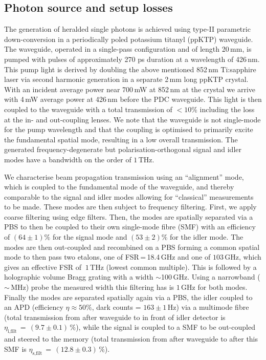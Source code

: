 \documentclass[%
 reprint,
 amsmath,amssymb,
 aps,
 pra,
]{revtex4-1}
\begin{document}
\subsection{Photon source and setup losses}
The generation of heralded single photons is achieved using type-II parametric down-conversion in a periodically poled potassium titanyl (ppKTP) waveguide. The waveguide, operated in a single-pass configuration and of length 20$\,$mm, is pumped with pulses of approximately 270 ps duration at a wavelength of 426\,nm. This pump light is derived by doubling the above mentioned 852\,nm Ti:sapphire laser via second harmonic generation in a separate 2$\,$mm long ppKTP crystal. With an incident average power near 700\,mW at 852\,nm at the crystal we arrive with 4\,mW average power at 426\,nm before the PDC waveguide. This light is then coupled to the waveguide with a total transmission of $<10\%$ including the loss at the in- and out-coupling lenses. We note that the waveguide is not single-mode for the pump wavelength and that the coupling is optimised to primarily excite the fundamental spatial mode, resulting in a low overall transmission. The generated frequency-degenerate but polarisation-orthogonal signal and idler modes have a bandwidth on the order of $1\,$THz. 

We characterise beam propagation transmission using an ``alignment'' mode, which is coupled to the fundamental mode of the waveguide, and thereby comparable to the signal and idler modes allowing for ``classical'' measurements to be made. These modes are then subject to frequency filtering. First, we apply coarse filtering using edge filters. Then, the modes are spatially separated via a PBS to then be coupled to their own single-mode fibre (SMF) with an efficiency of $(64 \pm 1)\%$ for the signal mode and $(53 \pm 2)\%$ for the idler mode. The modes are then out-coupled and recombined on a PBS forming a common spatial mode to then pass two etalons, one of FSR$\,$=$\,$18.4$\,$GHz and one of $103\,$GHz, which gives an effective FSR of $~1\,$THz (lowest common multiple). This is followed by a holographic volume Bragg grating with a width $\sim$100$\,$GHz. Using a narrowband ($\sim\,$MHz) probe the measured width this filtering has is $1\,$GHz for both modes. Finally the modes are separated spatially again via a PBS, the idler coupled to an APD (efficiency $\eta \approx 50\%$, dark counts = $163\pm 1\,$Hz) via a multimode fibre (total transmission from after waveguide to in front of idler detector is $\eta_\textrm{i,filt}\,=\,(9.7\pm0.1)\,\%$), while the signal is coupled to a SMF to be out-coupled and steered to the memory (total transmission from after waveguide to after this SMF is $\eta_\textrm{s,filt}\,=\,(12.8 \pm 0.3)\,\%$). 
\end{document}
